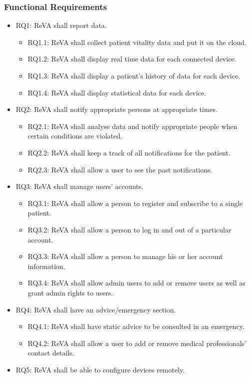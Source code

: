 \subsubsection{Functional Requirements}

\begin{itemize}
\item RQ1: ReVA shall report data.
	\begin{itemize}
	\item RQ1.1: ReVA shall collect patient vitality data and put it on the cloud.
	\item RQ1.2: ReVA shall display real time data for each connected device.
	\item RQ1.3: ReVA shall display a patient's history of data for each device.
	\item RQ1.4: ReVA shall display statistical data for each device.
	\end{itemize}

\item RQ2: ReVA shall notify appropriate persons at appropriate times.
	\begin{itemize}
	\item RQ2.1: ReVA shall analyse data and notify appropriate people when certain conditions are violated.
	\item RQ2.2: ReVA shall keep a track of all notifications for the patient.
	\item RQ2.3: ReVA shall allow a user to see the past notifications.
	\end{itemize}
	
\item RQ3: ReVA shall manage users' accounts.
	\begin{itemize}
	\item RQ3.1: ReVA shall allow a person to register and subscribe to a single patient.
	\item RQ3.2: ReVA shall allow a person to log in and out of a particular account.
	\item RQ3.3: ReVA shall allow a person to manage his or her account information.
	\item RQ3.4: ReVA shall allow admin users to add or remove users as well as grant admin rights to users.
	\end{itemize}

\item RQ4: ReVA shall have an advice/emergency section.
	\begin{itemize}
	\item RQ4.1: ReVA shall have static advice to be consulted in an emergency.
	\item RQ4.2: ReVA shall allow a user to add or remove medical professionals' contact details.
	\end{itemize}
	
\item RQ5: ReVA shall be able to configure devices remotely.
\end{itemize}